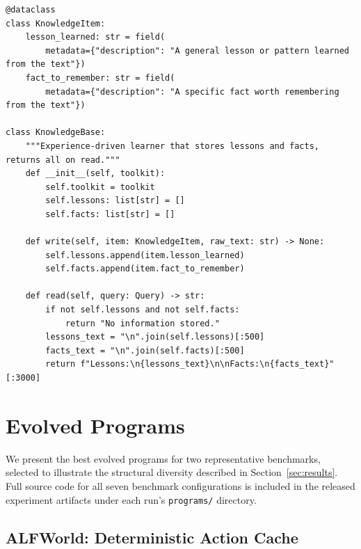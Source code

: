 \begin{lstlisting}[style=evolvedcode, caption={Seed 3: Experience Learner.}, label=lst:seed-experience]
@dataclass
class KnowledgeItem:
    lesson_learned: str = field(
        metadata={"description": "A general lesson or pattern learned from the text"})
    fact_to_remember: str = field(
        metadata={"description": "A specific fact worth remembering from the text"})

class KnowledgeBase:
    """Experience-driven learner that stores lessons and facts, returns all on read."""
    def __init__(self, toolkit):
        self.toolkit = toolkit
        self.lessons: list[str] = []
        self.facts: list[str] = []

    def write(self, item: KnowledgeItem, raw_text: str) -> None:
        self.lessons.append(item.lesson_learned)
        self.facts.append(item.fact_to_remember)

    def read(self, query: Query) -> str:
        if not self.lessons and not self.facts:
            return "No information stored."
        lessons_text = "\n".join(self.lessons)[:500]
        facts_text = "\n".join(self.facts)[:500]
        return f"Lessons:\n{lessons_text}\n\nFacts:\n{facts_text}"[:3000]
\end{lstlisting}


\FloatBarrier


\section{Evolved Programs}
\label{app:evolved-programs}

We present the best evolved programs for two representative benchmarks, selected to illustrate the structural diversity described in Section~\ref{sec:results}.
Full source code for all seven benchmark configurations is included in the released experiment artifacts under each run's \texttt{programs/} directory.

\subsection{ALFWorld: Deterministic Action Cache}
\label{app:evolved-alfworld}

